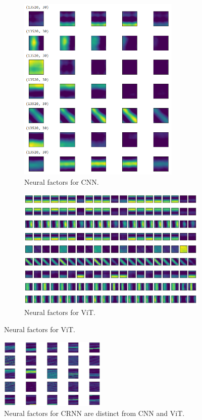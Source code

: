\begin{figure}[H]
\centering
\begin{subfigure}[b]{0.4\textwidth}
        \includegraphics[width=0.85\textwidth]{figures/artificial/cnn-factor.PNG}
        \caption{Neural factors for CNN.}
\end{subfigure}
\hfill
\begin{subfigure}[b]{0.57\textwidth}
        \includegraphics[width=\textwidth]{figures/artificial/vit-factor.PNG}
        \caption{Neural factors for ViT.}
\end{subfigure}
\end{figure} 
\begin{figure}[H]
\centering
    \includegraphics[width=0.45\textwidth]{figures/artificial/crnn-factor.png}
    \caption{Neural factors for CRNN are distinct from CNN and ViT.}
\end{figure}
